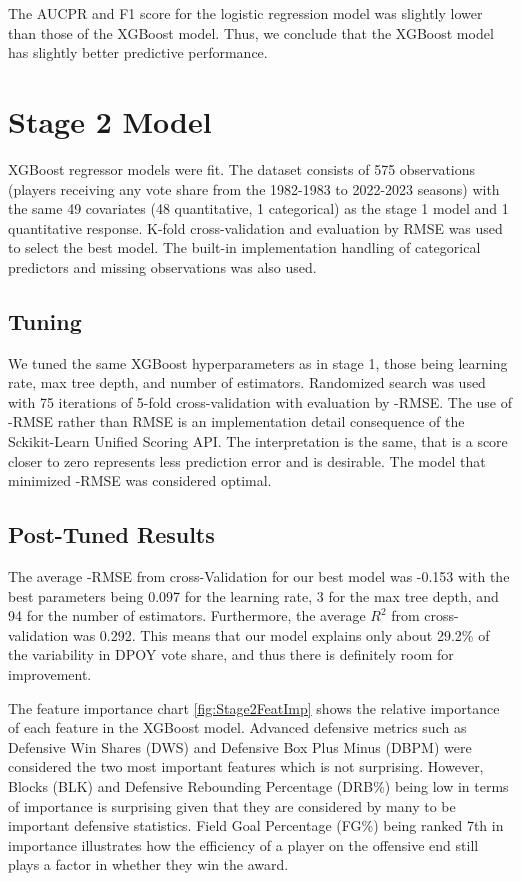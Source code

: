 \documentclass[letterpaper,titlepage]{article}
\begin{document}
    The AUCPR and F1 score for the logistic regression model was slightly lower than those of the XGBoost model. Thus, we conclude that the XGBoost model has slightly better predictive performance.

    
    \section{Stage 2 Model}

    XGBoost regressor models were fit. The dataset consists of 575 observations (players receiving any vote share from the 1982-1983 to 2022-2023 seasons) with the same 49 covariates (48 quantitative, 1 categorical) as the stage 1 model and 1 quantitative response. K-fold cross-validation and evaluation by RMSE was used to select the best model. The built-in implementation handling of categorical predictors and missing observations was also used.

    \subsection{Tuning}
    We tuned the same XGBoost hyperparameters as in stage 1, those being learning rate, max tree depth, and number of estimators. Randomized search was used with 75 iterations of 5-fold cross-validation with evaluation by -RMSE. The use of -RMSE rather than RMSE is an implementation detail consequence of the Sckikit-Learn Unified Scoring API. The interpretation is the same, that is a score closer to zero represents less prediction error and is desirable. The model that minimized -RMSE was considered optimal.

    \subsection{Post-Tuned Results}
    The average -RMSE from cross-Validation for our best model was -0.153 with the best parameters being 0.097 for the learning rate, 3 for the max tree depth, and 94 for the number of estimators. Furthermore, the average \(R^2\) from cross-validation was 0.292. This means that our model explains only about 29.2\% of the variability in DPOY vote share, and thus there is definitely room for improvement.

    The feature importance chart \autoref{fig:Stage2FeatImp} shows the relative importance of each feature in the XGBoost model. Advanced defensive metrics such as Defensive Win Shares (DWS) and Defensive Box Plus Minus (DBPM) were considered the two most important features which is not surprising. However, Blocks (BLK) and Defensive Rebounding Percentage (DRB\%) being low in terms of importance is surprising given that they are considered by many to be important defensive statistics. Field Goal Percentage (FG\%) being ranked 7th in importance illustrates how the efficiency of a player on the offensive end still plays a factor in whether they win the award. 
\end{document}
